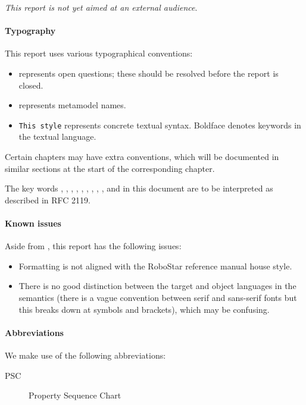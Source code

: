 
\emph{This report is not yet aimed at an external audience}.

\paragraph{Typography}
This report uses various typographical conventions:

\begin{itemize}
\item
	 represents open questions; these should be
	resolved before the report is closed.
\item
	 represents metamodel names.
\item
	\texttt{This style} represents concrete textual syntax.  Boldface
	denotes keywords in the textual language.
\end{itemize}

Certain chapters may have extra conventions, which will be documented in
similar sections at the start of the corresponding chapter.

The key words \rfcmust, \rfcmustnot, \rfcrequired, \rfcshall, \rfcshallnot,
\rfcshould, \rfcshouldnot, \rfcrecommended, \rfcmay, and \rfcoptional{} in this
document are to be interpreted as described in RFC 2119.

\paragraph{Known issues}
Aside from , this report has the following issues:

\begin{itemize}
\item
	Formatting is not aligned with the RoboStar reference manual house
	style.
\item
	There is no good distinction between the target and object languages
	in the semantics (there is a vague convention between serif and
	sans-serif fonts but this breaks down at symbols and brackets),
	which may be confusing.
\end{itemize}

\paragraph{Abbreviations} We make use of the following abbreviations:

\begin{description}
	\item[PSC] Property Sequence Chart~\cite{psc}
\end{description}

